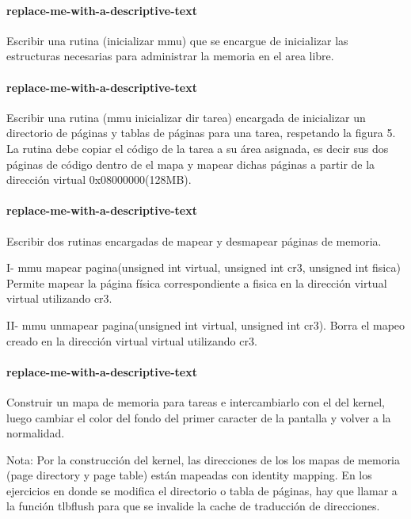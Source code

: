 \paragraph{replace-me-with-a-descriptive-text}\label{subsubsec:ej4-a}
Escribir una rutina (inicializar mmu) que se encargue de inicializar las
estructuras necesarias para administrar la memoria en el area libre.
\hruler
{}

\paragraph{replace-me-with-a-descriptive-text}\label{subsubsec:ej4-b}
Escribir una rutina (mmu inicializar dir tarea) encargada de inicializar un
directorio de páginas y tablas de páginas para una tarea, respetando la figura
5. La rutina debe copiar el código de la tarea a su área asignada, es decir sus
dos páginas de código dentro de el mapa y mapear dichas páginas a partir de la
dirección virtual 0x08000000(128MB).
\hruler
{}

\paragraph{replace-me-with-a-descriptive-text}\label{subsubsec:ej4-c}
Escribir dos rutinas encargadas de mapear y desmapear páginas de memoria.

I- mmu mapear pagina(unsigned int virtual, unsigned int cr3, unsigned int
fisica) Permite mapear la página física correspondiente a fisica en la dirección
virtual virtual utilizando cr3.

II- mmu unmapear pagina(unsigned int virtual, unsigned int cr3). Borra el mapeo
creado en la dirección virtual virtual utilizando cr3.
\hruler
{}

\paragraph{replace-me-with-a-descriptive-text}\label{subsubsec:ej4-d}
Construir un mapa de memoria para tareas e intercambiarlo con el del kernel,
luego cambiar el color del fondo del primer caracter de la pantalla y volver a
la normalidad.

Nota: Por la construcción del kernel, las direcciones de los los mapas de
memoria (page directory y page table) están mapeadas con identity mapping. En
los ejercicios en donde se modifica el directorio o tabla de páginas, hay que
llamar a la función tlbflush para que se invalide la cache de traducción de
direcciones.
\hruler
{}
